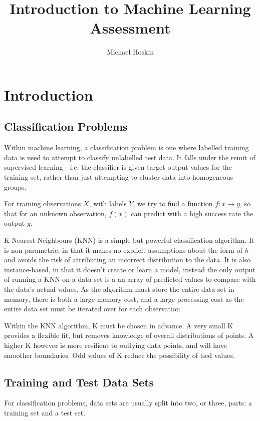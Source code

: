 \documentclass[11pt]{article} %
\title{Introduction to Machine Learning Assessment}
\author{Michael Hoskin}
\date{} %
\begin{document}
\maketitle

\section{Introduction}


\subsection{Classification Problems}

Within machine learning, a classification problem is one where labelled training data is used to attempt to classify unlabelled test data. It falls under the remit of supervised learning -  i.e. the classifier is given target output values for the training set, rather than just attempting to cluster data into homogeneous groups. 

For training observations $X$, with labels $Y$, we try to find a function $f : x \rightarrow y$, so that for an unknown observation, $f(x)$ can predict with a high success rate the output $y$.

K-Nearest-Neighbours (KNN) is a simple but powerful classification algorithm. It is non-parametric, in that it makes no explicit assumptions about the form of $h$ and avoids the risk of attributing an incorrect distribution to the data. It is also instance-based, in that it doesn't create or learn a model, instead the only output of running a KNN on a data set is a an array of predicted values to compare with the data's actual values. As the algorithm must store the entire data set in memory, there is both a large memory cost, and a large processing cost as the entire data set must be iterated over for each observation. 

Within the KNN algorithm, K must be chosen in advance. A very small K provides a flexible fit, but removes knowledge of overall distributions of points. A higher K however is more resilient to outlying data points, and will have smoother boundaries. Odd values of K reduce the possibility of tied values. 


\subsection{Training and Test Data Sets}

For classification problems, data sets are usually split into two, or three, parts: a training set and a test set.
\end{document}
